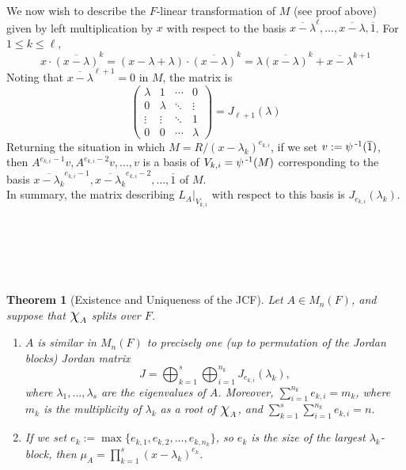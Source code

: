 \documentclass[11pt]{book}
\newcounter{counter}
\newtheorem{theorem}[counter]{Theorem}   \newtheorem*{theorem*}{Theorem}   \newtheorem{lemma}[counter]{Lemma}   \newtheorem{corollary}[counter]{Corollary}
\theoremstyle{definition}   \newtheorem{defn}[counter]{Definition} %
\newcommand{\ov}{\overline}   \newcommand{\wt}{\widetilde}
\newcommand{\mymatrix}[2]{\left( \begin{array}{#1} #2 \end{array} \right)}
\newcommand{\Chi}{\mbox{\Large $\chi$}}
\newcommand{\vs}{\vspace{8pt}}
\numberwithin{counter}{chapter}
\begin{document}
\vs

We now wish to describe the $F$-linear transformation of $M$ (see proof above) given by left multiplication by $x$ with respect to the basis $\ov{x-\lambda}^\ell,\dots,\ov{x-\lambda},\ov{1}$. For $1 \leq k \leq \ell$,
	\[x \cdot \ov{(x-\lambda)}^k = (x-\lambda + \lambda) \cdot \ov{(x-\lambda)}^k = \lambda \ov{(x-\lambda)}^k + \ov{x-\lambda}^{k+1}\]
Noting that $\ov{x-\lambda}^{\ell+1} = 0$ in $M$, the matrix is
	\[\mymatrix{cccc}{\lambda & 1 & \cdots & 0 \\ 0 & \lambda & \ddots & \vdots \\ \vdots & \vdots & \ddots & 1 \\ 0 & 0 & \cdots & \lambda} = J_{\ell+1}(\lambda) \]
Returning the situation in which $M = R/(x-\lambda_k)^{e_{k,i}}$, if we set $v := \psi\inv(\ov{1})$, then $A^{e_{k,i}-1} v, A^{e_{k,i}-2}v, \dots, v$ is a basis of $V_{k,i} = \psi\operatorname{^{-1}}(M)$ corresponding to the basis $\ov{x-\lambda_k}^{e_{k,i}-1},\ov{x-\lambda_k}^{e_{k,i}-2},\dots,\ov{1}$ of $M$. \\

In summary, the matrix describing $L_A|_{V_{k,i}}$ with respect to this basis is $J_{e_{k,i}}(\lambda_k)$. 

\vs \ \\ \ \\ \ \\ \ \\

\begin{theorem}[Existence and Uniqueness of the JCF] Let $A \in M_n(F)$, and suppose that $\Chi_A$ splits over $F$.
\begin{enumerate}
\item[(a)] $A$ is similar in $M_n(F)$ to precisely one (up to permutation of the Jordan blocks) Jordan matrix
	\[J = \bigoplus_{k=1}^s \bigoplus_{i=1}^{n_k} J_{e_{k,i}}(\lambda_k), \]
where $\lambda_1,\dots,\lambda_s$ are the eigenvalues of $A$. Moreover, $\sum_{i=1}^{n_k} e_{k,i} = m_k$, where $m_k$ is the multiplicity of $\lambda_k$ as a root of $\Chi_A$, and $\sum_{k=1}^s \sum_{i=1}^{n_k} e_{k,i} = n$.

\item[(b)] If we set $e_k := \max\{e_{k,1},e_{k,2},\dots,e_{k,n_k}\}$, so $e_k$ is the size of the largest $\lambda_k$-block, then $\mu_A = \prod_{k=1}^s (x-\lambda_k)^{e_k}$. 
\end{enumerate}
\end{theorem}
\end{document}
